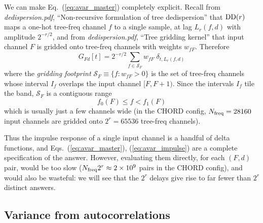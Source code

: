 \documentclass{article}
\numberwithin{equation}{section}   %
\def\DD{{\rm DD}}
\newcommand{\ddnotes}[1]{{\em dedispersion.pdf}, ``#1''}
\begin{document}
We can make Eq.\ (\ref{eq:avar_master}) completely explicit. Recall from
\ddnotes{Non-recursive formulation of tree dedispersion} that $\DD(r)$ maps a one-hot
tree-freq channel $f$ to a single
sample, at lag $L_r(f,d)$ with amplitude $2^{-r/2}$, and from \ddnotes{Tree gridding kernel} that input
channel $F$ is gridded onto tree-freq channels with weights $w_{fF}$. Therefore
\begin{equation}
G_{Fd}[t] = 2^{-r/2} \sum_{f \in {\mathcal S}_F} w_{fF} \; \delta_{t, L_r(f,d)}
  \label{eq:avar_impulse}
\end{equation}
where the {\em gridding footprint} ${\mathcal S}_F \equiv \{ f : w_{fF} > 0 \}$ is the set of
tree-freq channels whose interval $I_f$ overlaps the input channel $[F,F+1)$. Since the intervals
$I_f$ tile the band, ${\mathcal S}_F$ is a contiguous range
\begin{equation}
f_0(F) \le f < f_1(F)
\end{equation}
which is usually just a few channels wide (in the CHORD config, $N_{\rm freq} = 28160$ input
channels are gridded onto $2^r = 65536$ tree-freq channels).

Thus the impulse response of a single input channel is a handful of delta functions, and
Eqs.\ (\ref{eq:avar_master}), (\ref{eq:avar_impulse}) are a complete specification of the answer.
However, evaluating them directly, for each $(F,d)$ pair, would be too slow
($N_{\rm freq} 2^r \approx 2 \times 10^9$ pairs in the CHORD config), and would also be wasteful:
we will see that the $2^r$ delays give rise to far fewer than $2^r$ distinct answers.

\subsection{Variance from autocorrelations}
\label{sec:avar_convolver}
\end{document}
